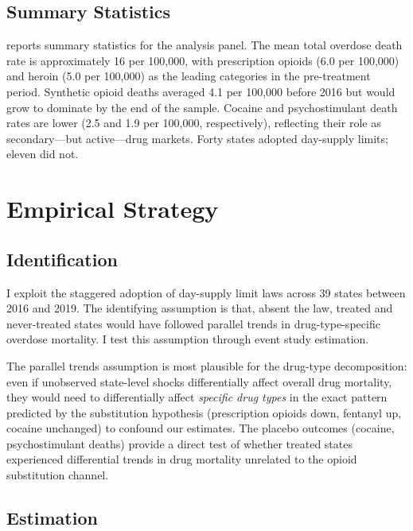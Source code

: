 \documentclass[12pt]{article}
\begin{document}
\subsection{Summary Statistics}



 reports summary statistics for the analysis panel. The mean total overdose death rate is approximately 16 per 100,000, with prescription opioids (6.0 per 100,000) and heroin (5.0 per 100,000) as the leading categories in the pre-treatment period. Synthetic opioid deaths averaged 4.1 per 100,000 before 2016 but would grow to dominate by the end of the sample. Cocaine and psychostimulant death rates are lower (2.5 and 1.9 per 100,000, respectively), reflecting their role as secondary---but active---drug markets. Forty states adopted day-supply limits; eleven did not.


\section{Empirical Strategy}

\subsection{Identification}

I exploit the staggered adoption of day-supply limit laws across 39 states between 2016 and 2019. The identifying assumption is that, absent the law, treated and never-treated states would have followed parallel trends in drug-type-specific overdose mortality. I test this assumption through event study estimation.

The parallel trends assumption is most plausible for the drug-type decomposition: even if unobserved state-level shocks differentially affect overall drug mortality, they would need to differentially affect \textit{specific drug types} in the exact pattern predicted by the substitution hypothesis (prescription opioids down, fentanyl up, cocaine unchanged) to confound our estimates. The placebo outcomes (cocaine, psychostimulant deaths) provide a direct test of whether treated states experienced differential trends in drug mortality unrelated to the opioid substitution channel.

\subsection{Estimation}
\end{document}
